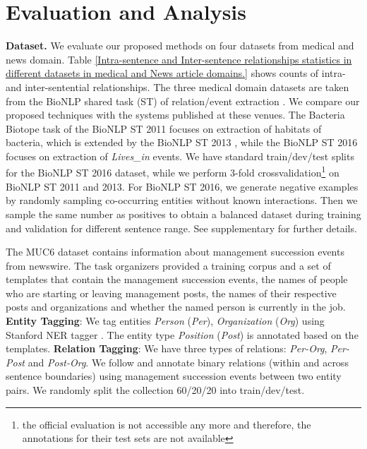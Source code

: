\documentclass[letterpaper]{article} \usepackage{aaai19}  \usepackage{times}  \usepackage{helvet}  \usepackage{courier}  \usepackage{url}  \usepackage{graphicx}
\begin{document}
\section{Evaluation and Analysis}\label{evaluation_and_analysis}


\textbf{Dataset.}
We evaluate our proposed methods on four datasets from medical and news domain.
Table  \ref{Intra-sentence and Inter-sentence relationships statistics in different datasets in medical and News article domains.} shows  counts of intra- and inter-sentential relationships.
The three medical domain datasets are taken from the BioNLP shared task (ST) of relation/event extraction \cite{bossy2011bionlp,nedellec2013overview,deleger2016overview}.  
We compare our proposed techniques with the systems published at these venues.  
The Bacteria Biotope task \cite{bossy2011bionlp} of the BioNLP ST 2011 focuses on extraction of habitats of bacteria, which is extended by 
the BioNLP ST 2013 \cite{nedellec2013overview}, while  the BioNLP ST 2016 focuses on extraction of \textit{Lives\_in} events. 
We have standard train/dev/test splits for the BioNLP ST 2016 dataset, while we perform 3-fold crossvalidation\footnote{the official evaluation is not accessible any more and therefore, the annotations for their test sets are not available} on BioNLP ST 2011 and 2013. 
For BioNLP ST 2016, we generate negative examples by randomly sampling co-occurring entities without known interactions. Then 
we sample the same number as positives to obtain a balanced dataset  during training and validation for different sentence range. 
See supplementary for further details.


The MUC6 \cite{grishman1996message} dataset contains information about management succession events from newswire. 
The task organizers provided a training corpus and a set of templates that contain the management succession events,    
the names of people who are starting or leaving management posts, the names of their respective posts and organizations and whether the named person is currently in the job. 
\textbf{Entity Tagging}: We tag entities {\it Person} (\textit{Per}), {\it Organization} (\textit{Org}) using Stanford NER tagger \cite{finkel2005incorporating}. 
The entity type {\it Position} (\textit{Post}) is annotated based on the templates. \textbf{Relation Tagging}: We have three types of relations: \textit{Per-Org}, \textit{Per-Post} and \textit{Post-Org}. 
We follow \citeauthor{swampillai2010inter}  and
annotate binary relations (within and across sentence boundaries) 
using management succession events between two entity pairs. 
We randomly split the collection
 60/20/20 into train/dev/test.
\end{document}
